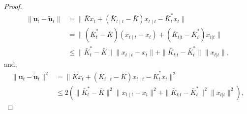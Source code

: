 \documentclass[letterpaper, 10 pt, conference]{ieeeconf}  %
\newcommand{\contTilde}[1]{\mathbf{\tilde{#1}}}
\begin{document}
\begin{proof}
\begin{align*}
    \|\mathbf{u}_{t} - \contTilde{u}_{t}\|
    &= \|\bar{K}x_{t} + (\bar{K}_{t\mid t}-\bar{K})x_{t\mid t} - \bar{K}_{t}^{*}x_{t}\|\\
    &= \|(\bar{K}_{t}^{*}-\bar{K})(x_{t\mid t}-x_{t})  + (\bar{K}_{t|t}-\bar{K}_{t}^{*})x_{t|t}\|\\
    &\leq \|\bar{K}_{t}^{*}-\bar{K}\|\|x_{t\mid t}-x_{t}\|  + \|\bar{K}_{t|t}-\bar{K}_{t}^{*}\| \|x_{t|t}\|,
\end{align*}
and,
\begin{align*}
    \|\mathbf{u}_{t} - \contTilde{u}_{t}\|^{2}
    &= \|\bar{K}x_{t} + (\bar{K}_{t\mid t}-\bar{K})x_{t\mid t} - \bar{K}_{t}^{*}x_{t}\|^{2}\\
    &\leq 2(\|\bar{K}_{t}^{*}-\bar{K}\|^{2}\|x_{t\mid t}-x_{t}\|^{2}  + \|\bar{K}_{t|t}-\bar{K}_{t}^{*}\|^{2} \|x_{t|t}\|^{2}),
\end{align*}


\end{proof}
\end{document}
